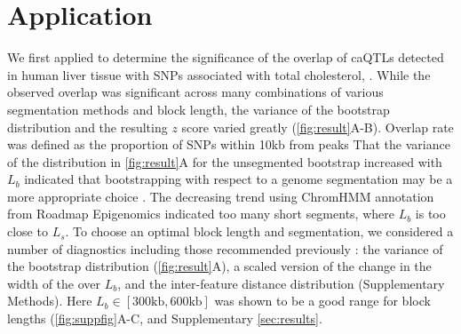 \vspace*{-20pt}
\section{Application}

We first applied \bootranges to determine the significance of the
overlap of caQTLs detected in human liver tissue
\citep{CURRIN20211169} with SNPs associated with total cholesterol,
.
While the observed overlap was significant across many combinations of
various segmentation methods and block length, the variance of the
bootstrap distribution and the resulting $z$ score varied greatly
(\cref{fig:result}A-B). Overlap rate was defined as the proportion of
SNPs within 10kb from peaks 
That the variance of the distribution in \cref{fig:result}A for the
unsegmented bootstrap increased with $L_b$ indicated that
bootstrapping with respect to a genome
segmentation may be a more appropriate choice
\citep{bickel2010subsampling}. 
The decreasing trend using ChromHMM annotation from
Roadmap Epigenomics indicated too many short segments,
where $L_b$ is too close to $L_s$.
To choose an optimal block length and segmentation, 
we considered a number of diagnostics including
those recommended previously \citep{bickel2010subsampling}:
the variance of the bootstrap distribution (\cref{fig:result}A),
a scaled version of the change in the width of the
 over $L_b$,
and the inter-feature distance distribution (Supplementary Methods).
Here $L_b \in [300\textrm{kb},600\textrm{kb}]$ was shown to be a good range for block
lengths (\cref{fig:suppfig}A-C, and Supplementary \cref{sec:results}.

